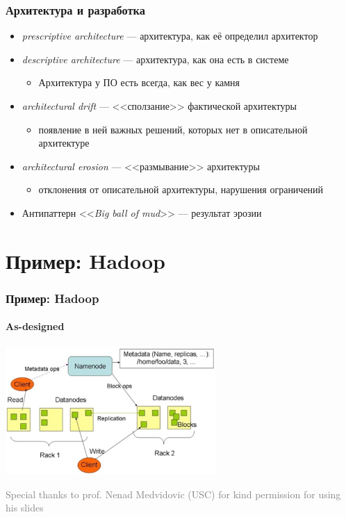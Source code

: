 \documentclass[xetex,mathserif,serif]{beamer}
\newcommand{\attribution}[1] {
	\begin{flushright}\begin{scriptsize}\textcolor{gray}{#1}\end{scriptsize}\end{flushright}
}
\begin{document}
	\begin{frame}
		\frametitle{Архитектура и разработка}
		\begin{itemize}
			\item \emph{prescriptive architecture} --- архитектура, как её определил архитектор
			\item \emph{descriptive architecture} --- архитектура, как она есть в системе
			\begin{itemize}
				\item Архитектура у ПО есть всегда, как вес у камня
			\end{itemize}
			\item \emph{architectural drift} --- <<сползание>> фактической архитектуры
			\begin{itemize}
				\item появление в ней важных решений, которых нет в описательной архитектуре
			\end{itemize}
			\item \emph{architectural erosion} --- <<размывание>> архитектуры
			\begin{itemize}
				\item отклонения от описательной архитектуры, нарушения ограничений
			\end{itemize}
			\item Антипаттерн <<\emph{Big ball of mud}>> --- результат эрозии
		\end{itemize}
	\end{frame}

	\section{Пример: Hadoop}

	\begin{frame}
		\frametitle{Пример: Hadoop}
		\framesubtitle{As-designed}
		\begin{center}
			\includegraphics[width=0.6\textwidth]{hadoopPrescriptive.png}
		\end{center}
		\attribution{Special thanks to prof. Nenad Medvidovic (USC) for kind permission for using his slides}
	\end{frame}
\end{document}
